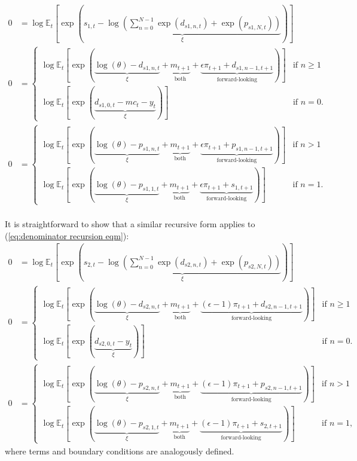 \documentclass[12 pt, oneside]{article}
\theoremstyle{definition}
\theoremstyle{definition}
\theoremstyle{definition}
\newcommand{\E}{\mathbb{E}}
\begin{document}
\begin{align}
  0 & = \log\E_t\left[\exp\left(\underbrace{s_{1, t} - \log\left(\sum_{n = 0}^{N - 1}\exp(d_{s1, n, t}) + \exp(p_{s1, N, t})\right)}_{\xi}\right)\right]\\
  0 & =
      \begin{cases}
        \log\E_t\left[\exp\left(\underbrace{\log(\theta) - d_{s1, n, t}}_{\xi} + \underbrace{m_{t + 1}}_{\text{both}} + \underbrace{\epsilon \pi_{t + 1} + d_{s1, n - 1, t + 1}}_{\text{forward-looking}}\right)\right] & \text{if } n \geq 1\\
        \log\E_t\left[\exp\left(\underbrace{d_{s1, 0, t} - mc_t - y_t}_{\xi}\right)\right] & \text{if } n = 0.
      \end{cases}\\
  0 & =
      \begin{cases}
        \log\E_t\left[\exp\left(\underbrace{\log(\theta) - p_{s1, n, t}}_{\xi} + \underbrace{m_{t + 1}}_{\text{both}} + \underbrace{\epsilon \pi_{t + 1} + p_{s1, n - 1, t + 1}}_{\text{forward-looking}} \right)\right] & \text{if } n > 1\\
        \log\E_t\left[\exp\left(\underbrace{\log(\theta) - p_{s1, 1, t}}_{\xi} + \underbrace{m_{t + 1}}_{\text{both}} + \underbrace{\epsilon \pi_{t + 1} + s_{1, t + 1}}_{\text{forward-looking}}\right)\right] & \text{if } n = 1.
      \end{cases}
\end{align}
\\

It is straightforward to show that a similar recursive form applies to (\ref{eq:denominator recursion eqm}):
\begin{align}
  0 & = \log\E_t\left[\exp\left(\underbrace{s_{2, t} - \log\left(\sum_{n = 0}^{N - 1}\exp(d_{s2, n, t}) + \exp(p_{s2, N, t})\right)}_{\xi}\right)\right]\\
  0 & =
      \begin{cases}
        \log\E_t\left[\exp\left(\underbrace{\log(\theta) - d_{s2, n, t}}_{\xi} + \underbrace{m_{t + 1}}_{\text{both}} + \underbrace{(\epsilon - 1) \pi_{t + 1} + d_{s2, n - 1, t + 1}}_{\text{forward-looking}}\right)\right] & \text{if } n \geq 1\\
        \log\E_t\left[\exp\left(\underbrace{d_{s2, 0, t} - y_t}_{\xi}\right)\right] & \text{if } n = 0.
      \end{cases}\\
  0 & =
      \begin{cases}
        \log\E_t\left[\exp\left(\underbrace{\log(\theta) - p_{s2, n, t}}_{\xi} + \underbrace{m_{t + 1}}_{\text{both}} + \underbrace{(\epsilon - 1) \pi_{t + 1} + p_{s2, n - 1, t + 1}}_{\text{forward-looking}} \right)\right] & \text{if } n > 1\\
        \log\E_t\left[\exp\left(\underbrace{\log(\theta) - p_{s2, 1, t}}_{\xi} + \underbrace{m_{t + 1}}_{\text{both}} + \underbrace{(\epsilon - 1)\pi_{t + 1} + s_{2, t + 1}}_{\text{forward-looking}}\right)\right] & \text{if } n = 1,
      \end{cases}
\end{align}
where terms and boundary conditions are analogously defined.
\end{document}
